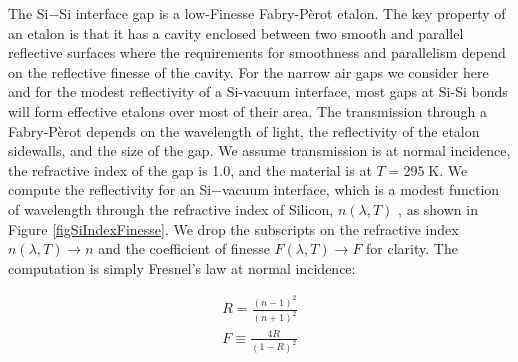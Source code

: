 \documentclass[osajnl,preprint,showpacs,superscriptaddress,12pt]{revtex4-1} %
\begin{document}
The Si$-$Si interface gap is a low-Finesse Fabry-P\`{e}rot etalon\cite{2007fuph.book.....S}.  The key property of an etalon is that it has a cavity enclosed between two smooth and parallel reflective surfaces where the requirements for smoothness and parallelism depend on the reflective finesse of the cavity.  For the narrow air gaps we consider here and for the modest reflectivity of a Si-vacuum interface, most gaps at Si-Si bonds will form effective etalons over most of their area.  The transmission through a Fabry-P\`{e}rot depends on the wavelength of light, the reflectivity of the etalon sidewalls, and the size of the gap.  We assume transmission is at normal incidence, the refractive index of the gap is 1.0, and the material is at $T= 295\;$K.  We compute the reflectivity for an Si$-$vacuum interface, which is a modest function of wavelength through the refractive index of Silicon, $n(\lambda, T)$ \cite{2006SPIE.6273E..77F}, as shown in Figure \ref{figSiIndexFinesse}.  We drop the subscripts on the refractive index $n(\lambda, T) \rightarrow n$ and the coefficient of finesse $F(\lambda, T) \rightarrow F$ for clarity.  The computation is simply Fresnel's law at normal incidence:

\begin{eqnarray}
R = \frac{(n-1)^2}{(n+1)^2} \label{Eq:FresnelR}\\
F \equiv \frac{4R}{(1-R)^2} \label{Eq:coeffF}
\end{eqnarray}
\end{document}
